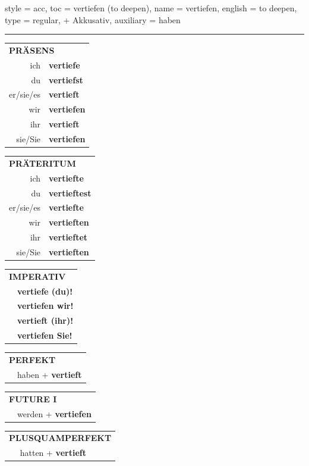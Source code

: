 \begin{verbentry}{
  style = {acc},
  toc = {vertiefen (to deepen)},
  name = {vertiefen},
  english = {to deepen},
  type = {regular, + Akkusativ},
  auxiliary = {haben}
}


\vspace{5pt}
\hrule
\vspace{5pt}

\begin{tabular}{rl}
\multicolumn{2}{l}{\textbf{PRÄSENS}}\\
ich & \textbf{vertiefe}\\
du & \textbf{vertiefst}\\
er/sie/es & \textbf{vertieft}\\
wir & \textbf{vertiefen}\\
ihr & \textbf{vertieft}\\
sie/Sie & \textbf{vertiefen}\\
\end{tabular}
\hfill
\begin{tabular}{rl}
\multicolumn{2}{l}{\textbf{PRÄTERITUM}}\\
ich & \textbf{vertiefte}\\
du & \textbf{vertieftest}\\
er/sie/es & \textbf{vertiefte}\\
wir & \textbf{vertieften}\\
ihr & \textbf{vertieftet}\\
sie/Sie & \textbf{vertieften}\\
\end{tabular}
\hfill
\begin{tabular}{rl}
\multicolumn{2}{l}{\textbf{IMPERATIV}}\\
& \textbf{vertiefe (du)!}\\
& \textbf{vertiefen wir!}\\
& \textbf{vertieft (ihr)!}\\
& \textbf{vertiefen Sie!}\\
\end{tabular}

\vspace{10pt}

\begin{tabular}{rl}
\multicolumn{2}{l}{\textbf{PERFEKT}}\\
& haben + \textbf{vertieft}\\
\end{tabular}
\hfill
\begin{tabular}{rl}
\multicolumn{2}{l}{\textbf{FUTURE I}}\\
& werden + \textbf{vertiefen}\\
\end{tabular}
\hfill
\begin{tabular}{rl}
\multicolumn{2}{l}{\textbf{PLUSQUAMPERFEKT}}\\
& hatten + \textbf{vertieft}\\
\end{tabular}


\end{verbentry}
